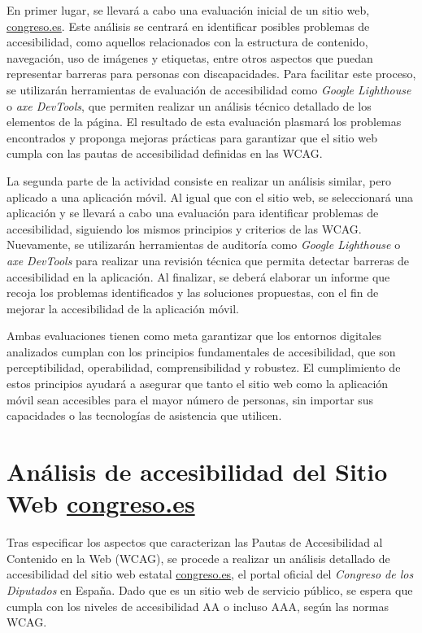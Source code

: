 \documentclass[]{article}
\begin{document}
En primer lugar, se llevará a cabo una evaluación inicial de un sitio web, \href{https://www.congreso.es/es/home}{congreso.es}. Este análisis se centrará en identificar posibles problemas de accesibilidad, como aquellos relacionados con la estructura de contenido, navegación, uso de imágenes y etiquetas, entre otros aspectos que puedan representar barreras para personas con discapacidades. Para facilitar este proceso, se utilizarán herramientas de evaluación de accesibilidad como \textit{Google Lighthouse} o \textit{axe DevTools}, que permiten realizar un análisis técnico detallado de los elementos de la página. El resultado de esta evaluación plasmará los problemas encontrados y proponga mejoras prácticas para garantizar que el sitio web cumpla con las pautas de accesibilidad definidas en las WCAG. 

La segunda parte de la actividad consiste en realizar un análisis similar, pero aplicado a una aplicación móvil. Al igual que con el sitio web, se seleccionará una aplicación y se llevará a cabo una evaluación para identificar problemas de accesibilidad, siguiendo los mismos principios y criterios de las WCAG. Nuevamente, se utilizarán herramientas de auditoría como \textit{Google Lighthouse} o \textit{axe DevTools} para realizar una revisión técnica que permita detectar barreras de accesibilidad en la aplicación. Al finalizar, se deberá elaborar un informe que recoja los problemas identificados y las soluciones propuestas, con el fin de mejorar la accesibilidad de la aplicación móvil. 

Ambas evaluaciones tienen como meta garantizar que los entornos digitales analizados cumplan con los principios fundamentales de accesibilidad, que son perceptibilidad, operabilidad, comprensibilidad y robustez. El cumplimiento de estos principios ayudará a asegurar que tanto el sitio web como la aplicación móvil sean accesibles para el mayor número de personas, sin importar sus capacidades o las tecnologías de asistencia que utilicen.

\newpage

\section{Análisis de accesibilidad del Sitio Web \href{https://www.congreso.es/es/home}{congreso.es}}

Tras especificar los aspectos que caracterizan las Pautas de Accesibilidad al Contenido en la Web (WCAG), se procede a realizar un análisis detallado de accesibilidad del sitio web estatal \href{https://www.congreso.es/es/home}{congreso.es}, el portal oficial del \textit{Congreso de los Diputados} en España. Dado que es un sitio web de servicio público, se espera que cumpla con los niveles de accesibilidad AA o incluso AAA, según las normas WCAG.
\end{document}
